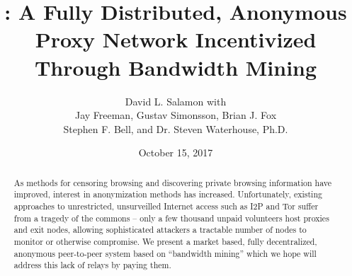 \documentclass{article}
\title{\mesh{}: A Fully Distributed, Anonymous Proxy Network Incentivized Through Bandwidth Mining}
\author{{David L. Salamon with} \\ {Jay Freeman, Gustav Simonsson, Brian J. Fox} \\ {{Stephen F. Bell, and Dr. Steven Waterhouse, Ph.D.}}}
\date{October 15, 2017}
\begin{document}
\maketitle

\begin{abstract}

  As methods for censoring browsing and discovering private browsing information have improved, interest in anonymization methods has increased. Unfortunately, existing approaches to unrestricted, unsurveilled Internet access such
as I2P and Tor suffer from a tragedy of the commons – only a few thousand unpaid volunteers host proxies and exit nodes, allowing sophisticated attackers a tractable number of nodes to monitor or otherwise compromise. We present a market based, fully decentralized, anonymous peer-to-peer system based on “bandwidth mining” which we hope will address this lack of relays by paying them.






\end{abstract}
\end{document}
